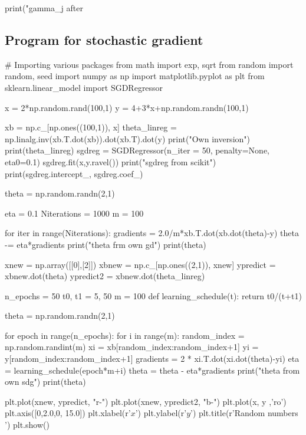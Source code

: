 \documentclass[%
oneside,                 %
final,                   %
10pt]{article}
\begin{document}
print("gamma_j after %
\epycod





\subsection{Program for stochastic gradient}

\bpycod
# Importing various packages
from math import exp, sqrt
from random import random, seed
import numpy as np
import matplotlib.pyplot as plt
from sklearn.linear_model import SGDRegressor

x = 2*np.random.rand(100,1)
y = 4+3*x+np.random.randn(100,1)

xb = np.c_[np.ones((100,1)), x]
theta_linreg = np.linalg.inv(xb.T.dot(xb)).dot(xb.T).dot(y)
print("Own inversion")
print(theta_linreg)
sgdreg = SGDRegressor(n_iter = 50, penalty=None, eta0=0.1)
sgdreg.fit(x,y.ravel())
print("sgdreg from scikit")
print(sgdreg.intercept_, sgdreg.coef_)


theta = np.random.randn(2,1)

eta = 0.1
Niterations = 1000
m = 100

for iter in range(Niterations):
    gradients = 2.0/m*xb.T.dot(xb.dot(theta)-y)
    theta -= eta*gradients
print("theta frm own gd")
print(theta)

xnew = np.array([[0],[2]])
xbnew = np.c_[np.ones((2,1)), xnew]
ypredict = xbnew.dot(theta)
ypredict2 = xbnew.dot(theta_linreg)


n_epochs = 50
t0, t1 = 5, 50
m = 100
def learning_schedule(t):
    return t0/(t+t1)

theta = np.random.randn(2,1)

for epoch in range(n_epochs):
    for i in range(m):
        random_index = np.random.randint(m)
        xi = xb[random_index:random_index+1]
        yi = y[random_index:random_index+1]
        gradients = 2 * xi.T.dot(xi.dot(theta)-yi)
        eta = learning_schedule(epoch*m+i)
        theta = theta - eta*gradients
print("theta from own sdg")
print(theta)






plt.plot(xnew, ypredict, "r-")
plt.plot(xnew, ypredict2, "b-")
plt.plot(x, y ,'ro')
plt.axis([0,2.0,0, 15.0])
plt.xlabel(r'$x$')
plt.ylabel(r'$y$')
plt.title(r'Random numbers ')
plt.show()

\epycod
\end{document}
